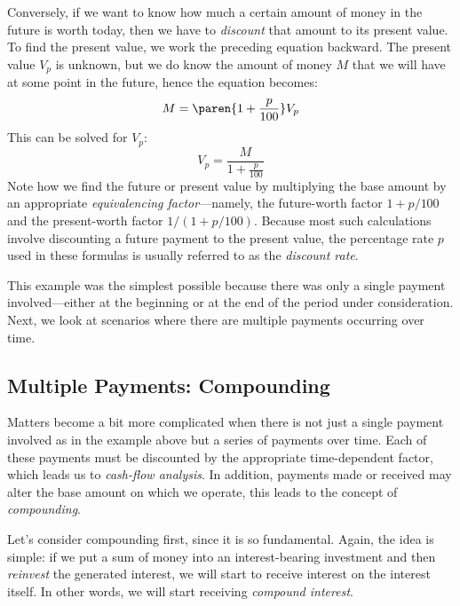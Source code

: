 Conversely, if we want to know how much a certain amount of money in
the future is worth today, then we have to \emph{discount} that amount
to its present value. To find the present value, we work the preceding
equation backward. The present value $V_p$ is unknown, but we do know
the amount of money $M$ that we will have at some point in the future,
hence the equation becomes:
%
\[
M = \paren{ 1 + \frac{p}{100} } V_p
\]
%    
This can be solved for $V_p$:
%
\[
V_p = \frac{M}{1+\frac{p}{100}}
\]
%   
Note how we find the future or present value by multiplying the base
amount by an appropriate \emph{equivalencing factor}---namely, the
future-worth factor $1+p/100$ and the present-worth factor
$1/(1+p/100)$. Because most such calculations involve discounting a
future payment to the present value, the percentage rate $p$ used in
these formulas is usually referred to as the \emph{discount rate}.
    
This example was the simplest possible because there was only a single
payment involved---either at the beginning or at the end of the period
under consideration. Next, we look at scenarios where there are
multiple payments occurring over time.

\subsection{Multiple Payments: Compounding}

    
Matters become a bit more complicated when there is not just a single
payment involved as in the example above but a series of payments
over time. Each of these payments must be discounted by the
appropriate time-dependent factor, which leads us to \emph{cash-flow
  analysis}.  In addition, payments made or received may alter the
base amount on which we operate, this leads to the concept of
\emph{compounding}.

Let's consider compounding first, since it is so fundamental. Again,
the idea is simple: if we put a sum of money into an interest-bearing
investment and then \emph{reinvest} the generated interest, we will
start to receive interest on the interest itself. In other words, we
will start receiving \emph{compound interest}.

